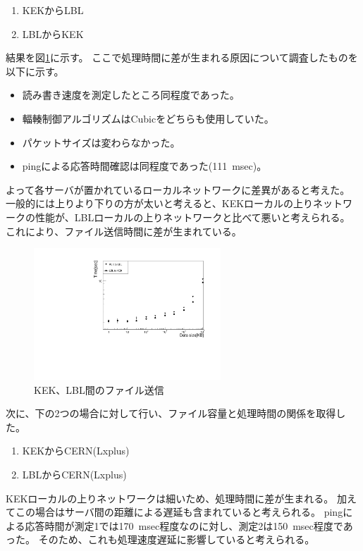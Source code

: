 \begin{enumerate}
  \item KEKからLBL
  \item LBLからKEK
\end{enumerate}

結果を図\ref{datasize_vs_time_kek_lbl}に示す。
ここで処理時間に差が生まれる原因について調査したものを以下に示す。
\begin{itemize}
  \item 読み書き速度を測定したところ同程度であった。
  \item 輻輳制御アルゴリズムはCubicをどちらも使用していた。
  \item パケットサイズは変わらなかった。
  \item pingによる応答時間確認は同程度であった(111~msec)。
\end{itemize}

よって各サーバが置かれているローカルネットワークに差異があると考えた。
一般的には上りより下りの方が太いと考えると、KEKローカルの上りネットワークの性能が、LBLローカルの上りネットワークと比べて悪いと考えられる。
これにより、ファイル送信時間に差が生まれている。

\begin{figure}[bpt]\centering
  \begin{center}
    \includegraphics[width=7cm,angle=270]{./scp_kek_lbl.pdf}
  \caption[KEK、LBL間のファイル送信]{KEK、LBL間のファイル送信}
  \label{datasize_vs_time_kek_lbl}
  \end{center}
\end{figure}

次に、下の2つの場合に対して行い、ファイル容量と処理時間の関係を取得した。
\begin{enumerate}
  \item KEKからCERN(Lxplus)
  \item LBLからCERN(Lxplus)
\end{enumerate}

KEKローカルの上りネットワークは細いため、処理時間に差が生まれる。
加えてこの場合はサーバ間の距離による遅延も含まれていると考えられる。
pingによる応答時間が測定1では170~msec程度なのに対し、測定2は150~msec程度であった。
そのため、これも処理速度遅延に影響していると考えられる。


